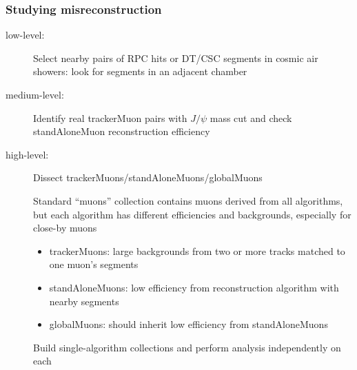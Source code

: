 \documentclass[compress]{beamer}
\begin{document}
\begin{frame}
\frametitle{Studying misreconstruction}

\begin{description}
\item[low-level:] Select nearby pairs of RPC hits or DT/CSC segments
  in cosmic air showers: look for segments in an adjacent chamber

\item[medium-level:] Identify real trackerMuon pairs with $J/\psi$
  mass cut and check standAloneMuon reconstruction efficiency

\item[high-level:] Dissect trackerMuons/standAloneMuons/globalMuons

Standard ``muons'' collection contains muons derived from all
algorithms, but each algorithm has different efficiencies and
backgrounds, especially for close-by muons
\begin{itemize}
\item trackerMuons: large backgrounds from two or more tracks matched
  to one muon's segments
\item standAloneMuons: low efficiency from reconstruction algorithm
  with nearby segments
\item globalMuons: should inherit low efficiency from standAloneMuons
\end{itemize}

Build single-algorithm collections and perform analysis independently on each
\end{description}
\end{frame}
\end{document}
